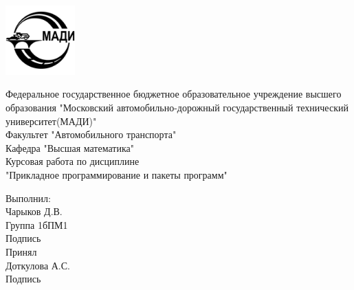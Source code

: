 \begin{titlepage}
\begin{center}
\includegraphics[width=0.2\textwidth]{images/university_logo.jpg}
\end{center}

\begin{center}
\LARGE
Федеральное государственное бюджетное образовательное 
учреждение высшего образования "Московский автомобильно-дорожный 
государственный технический университет(МАДИ)"\\

\vspace{2cm}
Факультет "Автомобильного транспорта"\\
Кафедра "Высшая математика"\\


\vspace{2cm}
Курсовая работа по дисциплине\\
"Прикладное программирование и пакеты программ"\\
\end{center}

\vfill
\begin{flushright}
    
Выполнил:\\
Чарыков Д.В.\\
Группа 1бПМ1\\
Подпись\\
\vspace{1cm}
Принял\\
Доткулова А.С.\\
\vspace{1cm}
Подпись
\end{flushright}
\end{titlepage}